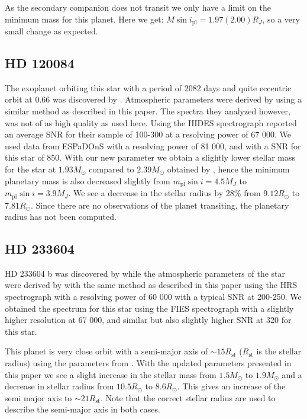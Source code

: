 \documentclass{aa}
\begin{document}
As the secondary companion does not transit we only have a limit on the minimum
mass for this planet. Here we get: $M\sin i_\mathrm{pl} = 1.97(2.00)R_J$, so a
very small change as expected.


\subsection{HD 120084}
\label{sub:HD_120084}
The exoplanet orbiting this star with a period of 2082 days and quite eccentric
orbit at 0.66 was discovered by \citet{Sato2013}. Atmospheric parameters were
derived by \citet{Takeda2008} using a similar method as described in this paper.
The spectra they analyzed however, was not of as high quality as used here.
Using the HIDES spectrograph \citet{Takeda2008} reported an average SNR for
their sample of 100-300 at a resolving power of 67 000. We used data from
ESPaDOnS with a resolving power of 81 000, and with a SNR for this star of 850.
With our new parameter we obtain a slightly lower stellar mass for the star at
$1.93M_\odot$ compared to $2.39M_\odot$ obtained by \cite{Takeda2008}, hence the
minimum planetary mass is also decreased slightly from $m_\mathrm{pl}\sin
i=4.5M_J$ to $m_\mathrm{pl}\sin i=3.9M_J$. We see a decrease in the stellar
radius by 28\% from $9.12R_\odot$ to $7.81R_\odot$. Since there are no
observations of the planet transiting, the planetary radius has not been
computed.


\subsection{HD 233604}
\label{sub:HD_233604}
HD 233604 b was discovered by \citet{Nowak2013} while the atmospheric parameters
of the star were derived by \citet{Zielinski2012} with the same method as
described in this paper using the HRS spectrograph with a resolving power of 60
000 with a typical SNR at 200-250. We obtained the spectrum for this star using
the FIES spectrograph with a slightly higher resolution at 67 000, and similar
but also slightly higher SNR at 320 for this star.

This planet is very close orbit with a semi-major axis of $\sim 15R_\mathrm{st}$
($R_\mathrm{st}$ is the stellar radius) using the parameters from
\citet{Nowak2013}. With the updated parameters presented in this paper we see a
slight increase in the stellar mass from $1.5M_\odot$ to $1.9M_\odot$ and a
decrease in stellar radius from $10.5R_\odot$ to $8.6R_\odot$. This gives an
increase of the semi major axis to $\sim 21R_\mathrm{st}$. Note that the correct
stellar radius are used to describe the semi-major axis in both cases.
\end{document}
